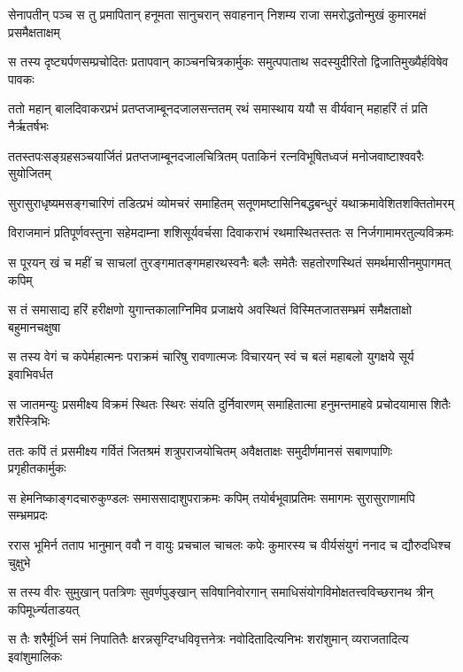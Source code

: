 
\twolineshloka
{सेनापतीन् पञ्च स तु प्रमापितान् हनूमता सानुचरान् सवाहनान्}
{निशम्य राजा समरोद्धतोन्मुखं कुमारमक्षं प्रसमैक्षताक्षम्} %

\twolineshloka
{स तस्य दृष्ट्यर्पणसम्प्रचोदितः प्रतापवान् काञ्चनचित्रकार्मुकः}
{समुत्पपाताथ सदस्युदीरितो द्विजातिमुख्यैर्हविषेव पावकः} %

\twolineshloka
{ततो महान् बालदिवाकरप्रभं प्रतप्तजाम्बूनदजालसन्ततम्}
{रथं समास्थाय ययौ स वीर्यवान् महाहरिं तं प्रति नैर्ऋतर्षभः} %

\twolineshloka
{ततस्तपःसङ्ग्रहसञ्चयार्जितं प्रतप्तजाम्बूनदजालचित्रितम्}
{पताकिनं रत्नविभूषितध्वजं मनोजवाष्टाश्ववरैः सुयोजितम्} %

\twolineshloka
{सुरासुराधृष्यमसङ्गचारिणं तडित्प्रभं व्योमचरं समाहितम्}
{सतूणमष्टासिनिबद्धबन्धुरं यथाक्रमावेशितशक्तितोमरम्} %

\twolineshloka
{विराजमानं प्रतिपूर्णवस्तुना सहेमदाम्ना शशिसूर्यवर्चसा}
{दिवाकराभं रथमास्थितस्ततः स निर्जगामामरतुल्यविक्रमः} %

\twolineshloka
{स पूरयन् खं च महीं च साचलां तुरङ्गमातङ्गमहारथस्वनैः}
{बलैः समेतैः सहतोरणस्थितं समर्थमासीनमुपागमत् कपिम्} %

\twolineshloka
{स तं समासाद्य हरिं हरीक्षणो युगान्तकालाग्निमिव प्रजाक्षये}
{अवस्थितं विस्मितजातसम्भ्रमं समैक्षताक्षो बहुमानचक्षुषा} %

\twolineshloka
{स तस्य वेगं च कपेर्महात्मनः पराक्रमं चारिषु रावणात्मजः}
{विचारयन् स्वं च बलं महाबलो युगक्षये सूर्य इवाभिवर्धत} %

\twolineshloka
{स जातमन्युः प्रसमीक्ष्य विक्रमं स्थितः स्थिरः संयति दुर्निवारणम्}
{समाहितात्मा हनुमन्तमाहवे प्रचोदयामास शितैः शरैस्त्रिभिः} %

\twolineshloka
{ततः कपिं तं प्रसमीक्ष्य गर्वितं जितश्रमं शत्रुपराजयोचितम्}
{अवैक्षताक्षः समुदीर्णमानसं सबाणपाणिः प्रगृहीतकार्मुकः} %

\twolineshloka
{स हेमनिष्काङ्गदचारुकुण्डलः समाससादाशुपराक्रमः कपिम्}
{तयोर्बभूवाप्रतिमः समागमः सुरासुराणामपि सम्भ्रमप्रदः} %

\twolineshloka
{ररास भूमिर्न तताप भानुमान् ववौ न वायुः प्रचचाल चाचलः}
{कपेः कुमारस्य च वीर्यसंयुगं ननाद च द्यौरुदधिश्च चुक्षुभे} %

\twolineshloka
{स तस्य वीरः सुमुखान् पतत्रिणः सुवर्णपुङ्खान् सविषानिवोरगान्}
{समाधिसंयोगविमोक्षतत्त्वविच्छरानथ त्रीन् कपिमूर्ध्न्यताडयत्} %

\twolineshloka
{स तैः शरैर्मूर्ध्नि समं निपातितैः क्षरन्नसृग्दिग्धविवृत्तनेत्रः}
{नवोदितादित्यनिभः शरांशुमान् व्यराजतादित्य इवांशुमालिकः} %

